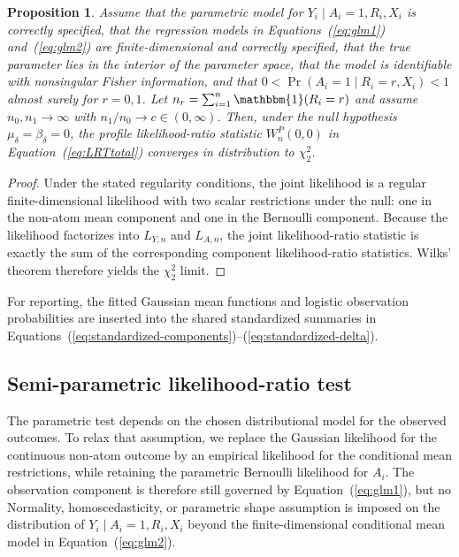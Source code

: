 \documentclass[11pt]{article}
\newtheorem{proposition}{Proposition}
\begin{document}
\begin{proposition}
Assume that the parametric model for $Y_i \mid A_i = 1, R_i, X_i$ is correctly specified, that the regression models in Equations~(\ref{eq:glm1}) and~(\ref{eq:glm2}) are finite-dimensional and correctly specified, that the true parameter lies in the interior of the parameter space, that the model is identifiable with nonsingular Fisher information, and that $0 < \Pr(A_i = 1 \mid R_i = r, X_i) < 1$ almost surely for $r = 0,1$. Let $n_r = \sum_{i = 1}^n \mathbbm{1}(R_i = r)$ and assume $n_0, n_1 \to \infty$ with $n_1 / n_0 \to c \in (0,\infty)$. Then, under the null hypothesis $\mu_\delta = \beta_\delta = 0$, the profile likelihood-ratio statistic $W_n^P(0,0)$ in Equation~(\ref{eq:LRTtotal}) converges in distribution to $\chi^2_2$.
\end{proposition}

\begin{proof}
Under the stated regularity conditions, the joint likelihood is a regular finite-dimensional likelihood with two scalar restrictions under the null: one in the non-atom mean component and one in the Bernoulli component. Because the likelihood factorizes into $L_{Y,n}$ and $L_{A,n}$, the joint likelihood-ratio statistic is exactly the sum of the corresponding component likelihood-ratio statistics. Wilks' theorem \citep{wilks1938large} therefore yields the $\chi^2_2$ limit.
\end{proof}

For reporting, the fitted Gaussian mean functions and logistic observation probabilities are inserted into the shared standardized summaries in Equations~(\ref{eq:standardized-components})--(\ref{eq:standardized-delta}).

\subsection{Semi-parametric likelihood-ratio test}

The parametric test depends on the chosen distributional model for the observed outcomes. To relax that assumption, we replace the Gaussian likelihood for the continuous non-atom outcome by an empirical likelihood for the conditional mean restrictions, while retaining the parametric Bernoulli likelihood for $A_i$. The observation component is therefore still governed by Equation~(\ref{eq:glm1}), but no Normality, homoscedasticity, or parametric shape assumption is imposed on the distribution of $Y_i \mid A_i = 1, R_i, X_i$ beyond the finite-dimensional conditional mean model in Equation~(\ref{eq:glm2}).
\end{document}
